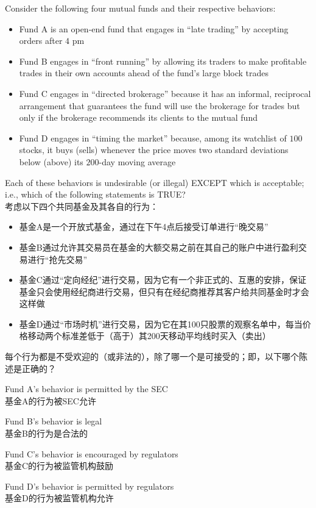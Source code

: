 \documentclass{article}
\newcounter{question} %
\begin{document}
\begin{question}
    Consider the following four mutual funds and their respective behaviors:
    \begin{itemize}
        \item Fund A is an open-end fund that engages in ``late trading'' by accepting orders after $4$ pm
        \item Fund B engages in ``front running'' by allowing its traders to make profitable trades in their own accounts ahead of the fund's large block trades
        \item Fund C engages in ``directed brokerage'' because it has an informal, reciprocal arrangement that guarantees the fund will use the brokerage for trades but only if the brokerage recommends its clients to the mutual fund
        \item Fund D engages in ``timing the market'' because, among its watchlist of $100$ stocks, it buys (sells) whenever the price moves two standard deviations below (above) its $200$-day moving average
    \end{itemize}
    Each of these behaviors is undesirable (or illegal) EXCEPT which is acceptable; i.e., which of the following statements is TRUE?
    \\考虑以下四个共同基金及其各自的行为：
    \begin{itemize}
        \item 基金A是一个开放式基金，通过在下午4点后接受订单进行“晚交易”
        \item 基金B通过允许其交易员在基金的大额交易之前在其自己的账户中进行盈利交易进行“抢先交易”
        \item 基金C通过“定向经纪”进行交易，因为它有一个非正式的、互惠的安排，保证基金只会使用经纪商进行交易，但只有在经纪商推荐其客户给共同基金时才会这样做
        \item 基金D通过“市场时机”进行交易，因为它在其100只股票的观察名单中，每当价格移动两个标准差低于（高于）其200天移动平均线时买入（卖出）
    \end{itemize}
    每个行为都是不受欢迎的（或非法的），除了哪一个是可接受的；即，以下哪个陈述是正确的？
\end{question}

\begin{choices}
    \item Fund A's behavior is permitted by the SEC
    \\基金A的行为被SEC允许
    \item Fund B's behavior is legal
    \\基金B的行为是合法的
    \item Fund C's behavior is encouraged by regulators
    \\基金C的行为被监管机构鼓励
    \item Fund D's behavior is permitted by regulators
    \\基金D的行为被监管机构允许
\end{choices}
\end{document}
